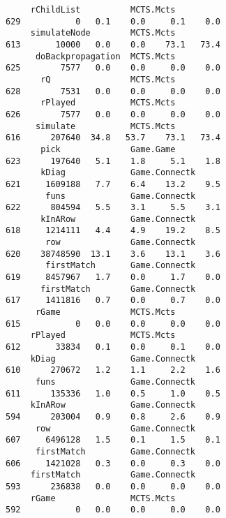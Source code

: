 \begin{tiny}
\begin{verbatim}
     rChildList          MCTS.Mcts                                            629           0   0.1    0.0     0.1    0.0
     simulateNode        MCTS.Mcts                                            613       10000   0.0    0.0    73.1   73.4
      doBackpropagation  MCTS.Mcts                                            625        7577   0.0    0.0     0.0    0.0
       rQ                MCTS.Mcts                                            628        7531   0.0    0.0     0.0    0.0
       rPlayed           MCTS.Mcts                                            626        7577   0.0    0.0     0.0    0.0
      simulate           MCTS.Mcts                                            616      207640  34.8   53.7    73.1   73.4
       pick              Game.Game                                            623      197640   5.1    1.8     5.1    1.8
       kDiag             Game.Connectk                                        621     1609188   7.7    6.4    13.2    9.5
        funs             Game.Connectk                                        622      804594   5.5    3.1     5.5    3.1
       kInARow           Game.Connectk                                        618     1214111   4.4    4.9    19.2    8.5
        row              Game.Connectk                                        620    38748590  13.1    3.6    13.1    3.6
        firstMatch       Game.Connectk                                        619     8457967   1.7    0.0     1.7    0.0
       firstMatch        Game.Connectk                                        617     1411816   0.7    0.0     0.7    0.0
      rGame              MCTS.Mcts                                            615           0   0.0    0.0     0.0    0.0
     rPlayed             MCTS.Mcts                                            612       33834   0.1    0.0     0.1    0.0
     kDiag               Game.Connectk                                        610      270672   1.2    1.1     2.2    1.6
      funs               Game.Connectk                                        611      135336   1.0    0.5     1.0    0.5
     kInARow             Game.Connectk                                        594      203004   0.9    0.8     2.6    0.9
      row                Game.Connectk                                        607     6496128   1.5    0.1     1.5    0.1
      firstMatch         Game.Connectk                                        606     1421028   0.3    0.0     0.3    0.0
     firstMatch          Game.Connectk                                        593      236838   0.0    0.0     0.0    0.0
     rGame               MCTS.Mcts                                            592           0   0.0    0.0     0.0    0.0

\end{verbatim}
\end{tiny}
